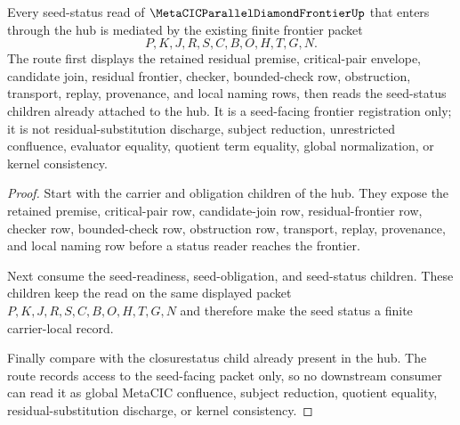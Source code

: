 \begin{theorem}
\label{thm:metacic-parallel-diamond-frontier-hub-seed-status-route}
Every seed-status read of $\MetaCICParallelDiamondFrontierUp$ that enters through the hub is mediated by the existing finite frontier packet
$$
P,K,J,R,S,C,B,O,H,T,G,N .
$$
The route first displays the retained residual premise, critical-pair envelope, candidate join, residual frontier, checker, bounded-check row, obstruction, transport, replay, provenance, and local naming rows, then reads the seed-status children already attached to the hub. It is a seed-facing frontier registration only; it is not residual-substitution discharge, subject reduction, unrestricted confluence, evaluator equality, quotient term equality, global normalization, or kernel consistency.
\end{theorem}
\begin{proof}
Start with the carrier and obligation children of the hub. They expose the retained premise, critical-pair row, candidate-join row, residual-frontier row, checker row, bounded-check row, obstruction row, transport, replay, provenance, and local naming row before a status reader reaches the frontier.

Next consume the seed-readiness, seed-obligation, and seed-status children. These children keep the read on the same displayed packet $P,K,J,R,S,C,B,O,H,T,G,N$ and therefore make the seed status a finite carrier-local record.

Finally compare with the closurestatus child already present in the hub. The route records access to the seed-facing packet only, so no downstream consumer can read it as global MetaCIC confluence, subject reduction, quotient equality, residual-substitution discharge, or kernel consistency.
\end{proof}
